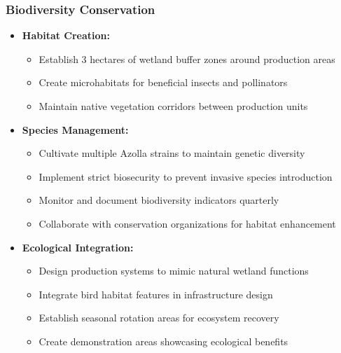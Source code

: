 \subsubsection{Biodiversity Conservation}
\begin{itemize}
    \item \textbf{Habitat Creation:}
    \begin{itemize}
        \item Establish 3 hectares of wetland buffer zones around production areas
        \item Create microhabitats for beneficial insects and pollinators
        \item Maintain native vegetation corridors between production units
    \end{itemize}
    
    \item \textbf{Species Management:}
    \begin{itemize}
        \item Cultivate multiple Azolla strains to maintain genetic diversity
        \item Implement strict biosecurity to prevent invasive species introduction
        \item Monitor and document biodiversity indicators quarterly
        \item Collaborate with conservation organizations for habitat enhancement
    \end{itemize}
    
    \item \textbf{Ecological Integration:}
    \begin{itemize}
        \item Design production systems to mimic natural wetland functions
        \item Integrate bird habitat features in infrastructure design
        \item Establish seasonal rotation areas for ecosystem recovery
        \item Create demonstration areas showcasing ecological benefits
    \end{itemize}
\end{itemize}

